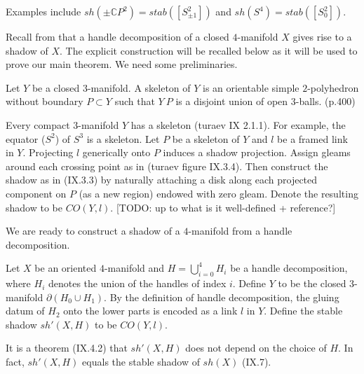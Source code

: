 \noindent Examples include
$sh(\pm\mathbb{C}P^{2}) = stab([S^{2}_{\pm 1}])$ and
$sh(S^{4}) = stab([S^{2}_{0}])$.

\noindent Recall from \cite[section IX. 4]{turaev} that a handle
decomposition of a closed $4$-manifold $X$ gives rise to a shadow
of $X$. The explicit construction will be recalled below as it
will be used to prove our main theorem. We need some
preliminaries.

\begin{definition}\label{def/skeleton-of-a-3-manifold}
  Let $Y$ be a closed $3$-manifold. A skeleton of $Y$ is an
  orientable simple $2$-polyhedron without boundary $P \subset Y$
  such that $Y \ P$ is a disjoint union of open $3$-balls.
  (p.400)
\end{definition}

\begin{definition}\label{def/shadow-cone-of-a-framed-link-in-a-3-manifold}
  \noindent Every compact $3$-manifold $Y$ has a skeleton (turaev
  IX 2.1.1). For example, the equator ($S^{2}$) of $S^{3}$ is a
  skeleton. Let $P$ be a skeleton of $Y$ and $l$ be a framed link
  in $Y$. Projecting $l$ generically onto $P$ induces a shadow
  projection. Assign gleams around each crossing point as in
  (turaev figure IX.3.4). Then construct the shadow as in
  (IX.3.3) by naturally attaching a disk along each projected
  component on $P$ (as a new region) endowed with zero gleam.
  Denote the resulting shadow to be $CO(Y,l)$. [TODO: up to what
  is it well-defined + reference?]
\end{definition}

\noindent We are ready to construct a shadow of a $4$-manifold
from a handle decomposition.

\begin{definition}\label{def/shadow-of-a-4-manifold-from-handle-decomposition}
  Let $X$ be an oriented $4$-manifold and
  $H = \bigcup_{i=0}^{4} H_{i}$ be a handle decomposition, where
  $H_{i}$ denotes the union of the handles of index $i$. Define
  $Y$ to be the closed $3$-manifold $\partial(H_{0} \cup H_{1})$.
  By the definition of handle decomposition, the gluing datum of
  $H_{2}$ onto the lower parts is encoded as a link $l$ in $Y$.
  Define the stable shadow $sh'(X,H)$ to be $CO(Y,l)$.
\end{definition}

\noindent It is a theorem (IX.4.2) that $sh'(X,H)$ does not
depend on the choice of $H$. In fact, $sh'(X,H)$ equals the
stable shadow of $sh(X)$ (IX.7).

